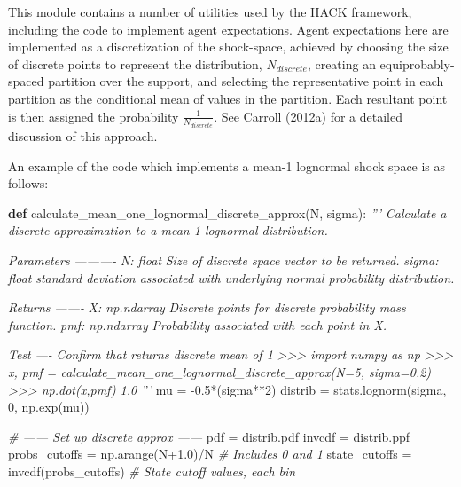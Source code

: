 \documentclass[]{article}
\newenvironment{Shaded}{}{}
\newcommand{\KeywordTok}[1]{\textcolor[rgb]{0.00,0.44,0.13}{\textbf{{#1}}}}
\newcommand{\DecValTok}[1]{\textcolor[rgb]{0.25,0.63,0.44}{{#1}}}
\newcommand{\FloatTok}[1]{\textcolor[rgb]{0.25,0.63,0.44}{{#1}}}
\newcommand{\CommentTok}[1]{\textcolor[rgb]{0.38,0.63,0.69}{\textit{{#1}}}}
\newcommand{\NormalTok}[1]{{#1}}
\begin{document}
This module contains a number of utilities used by the HACK framework,
including the code to implement agent expectations. Agent expectations
here are implemented as a discretization of the shock-space, achieved by
choosing the size of discrete points to represent the distribution,
$N_{discrete}$, creating an equiprobably-spaced partition over the
support, and selecting the representative point in each partition as the
conditional mean of values in the partition. Each resultant point is
then assigned the probability $\frac{1}{N_{discrete}}$. See Carroll
(2012a) for a detailed discussion of this approach.

An example of the code which implements a mean-1 lognormal shock space
is as follows:

\begin{Shaded}
\begin{Highlighting}[]
\KeywordTok{def} \NormalTok{calculate_mean_one_lognormal_discrete_approx(N, sigma):}
    \CommentTok{'''}
\CommentTok{    Calculate a discrete approximation to a mean-1 lognormal distribution.}

\CommentTok{    Parameters}
\CommentTok{    ----------}
\CommentTok{    N: float}
\CommentTok{        Size of discrete space vector to be returned.}
\CommentTok{    sigma: float}
\CommentTok{        standard deviation associated with underlying normal probability distribution.}

\CommentTok{    Returns}
\CommentTok{    -------}
\CommentTok{    X: np.ndarray}
\CommentTok{        Discrete points for discrete probability mass function.}
\CommentTok{    pmf: np.ndarray}
\CommentTok{        Probability associated with each point in X.}

\CommentTok{    Test}
\CommentTok{    ----}
\CommentTok{    Confirm that returns discrete mean of 1}
\CommentTok{    >>> import numpy as np}
\CommentTok{    >>> x, pmf = calculate_mean_one_lognormal_discrete_approx(N=5, sigma=0.2)}
\CommentTok{    >>> np.dot(x,pmf)}
\CommentTok{    1.0}
\CommentTok{    '''}
    \NormalTok{mu = -}\FloatTok{0.5}\NormalTok{*(sigma**}\DecValTok{2}\NormalTok{)}
    \NormalTok{distrib = stats.lognorm(sigma, }\DecValTok{0}\NormalTok{, np.exp(mu))}

    \CommentTok{# ------ Set up discrete approx ------}
    \NormalTok{pdf = distrib.pdf}
    \NormalTok{invcdf = distrib.ppf}
    \NormalTok{probs_cutoffs = np.arange(N}\FloatTok{+1.0}\NormalTok{)/N      }\CommentTok{# Includes 0 and 1}
    \NormalTok{state_cutoffs = invcdf(probs_cutoffs)   }\CommentTok{# State cutoff values, each bin}


\end{Highlighting}
\end{Shaded}
\end{document}
